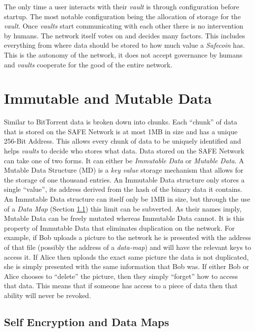 The only time a user interacts with their \textit{vault} is through configuration before startup. The most notable configuration being the allocation of storage for the \textit{vault}. Once \textit{vaults} start communicating with each other there is no intervention by humans. The network itself votes on and decides many factors. This includes everything from where data should be stored to how much value a \textit{Safecoin} has. This is the autonomy of the network, it does not accept governance by humans and \textit{vaults} cooperate for the good of the entire network.

\section{Immutable and Mutable Data}

Similar to BitTorrent data is broken down into chunks. Each ``chunk'' of data that is stored on the SAFE Network is at most 1MB in size and has a unique 256-Bit Address. This allows every chunk of data to be uniquely identified and helps \textit{vaults} to decide who stores what data. Data stored on the SAFE Network can take one of two forms. It can either be \textit{Immutable Data} or \textit{Mutable Data}. A Mutable Data Structure (MD) is a \textit{key value} storage mechanism that allows for the storage of one thousand entries. An Immutable Data structure only stores a single ``value'', its address derived from the hash of the binary data it contains. An Immutable Data structure can itself only be 1MB in size, but through the use of a \textit{Data Map} (Section \ref{subsec:self-encryption-data-map}) this limit can be subverted. As their names imply, Mutable Data can be freely mutated whereas Immutable Data cannot. It is this property of Immutable Data that eliminates duplication on the network. For example, if Bob uploads a picture to the network he is presented with the address of that file (possibly the address of a \textit{data-map}) and will have the relevant keys to access it. If Alice then uploads the exact same picture the data is not duplicated, she is simply presented with the same information that Bob was. If either Bob or Alice chooses to ``delete'' the picture, then they simply ``forget'' how to access that data. This means that if someone has access to a piece of data then that ability will never be revoked.

\subsection{Self Encryption and Data Maps}
\label{subsec:self-encryption-data-map}

